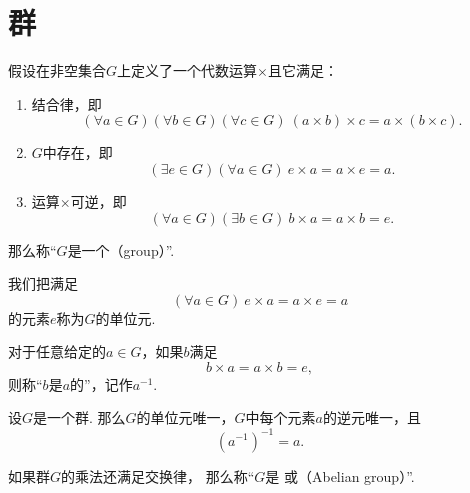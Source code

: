 
\section{群}
\begin{definition}
假设在非空集合\(G\)上定义了一个代数运算\(\times\)且它满足：
\begin{enumerate}
    \item 结合律，即\[
        (\forall a \in G)(\forall b \in G)(\forall c \in G)\:
        (a \times b) \times c = a \times (b \times c).
    \]

    \item \(G\)中存在，即\[
        (\exists e \in G)(\forall a \in G)\:
        e \times a = a \times e = a.
    \]

    \item 运算\(\times\)可逆，即\[
        (\forall a \in G)(\exists b \in G)\:
        b \times a = a \times b = e.
    \]
\end{enumerate}
那么称“\(G\)是一个（group）”.
\end{definition}

\begin{definition}
我们把满足\[
    (\forall a \in G)\:
    e \times a = a \times e = a
\]的元素\(e\)称为\(G\)的单位元.
\end{definition}

\begin{definition}
对于任意给定的\(a \in G\)，如果\(b\)满足\[
    b \times a = a \times b = e,
\]
则称“\(b\)是\(a\)的”，记作\(a^{-1}\).
\end{definition}

\begin{property}
设\(G\)是一个群.
那么\(G\)的单位元唯一，\(G\)中每个元素\(a\)的逆元唯一，且\[
    (a^{-1})^{-1} = a.
\]
\end{property}

\begin{definition}
如果群\(G\)的乘法还满足交换律，
那么称“\(G\)是%
或（Abelian group）”.
\end{definition}

